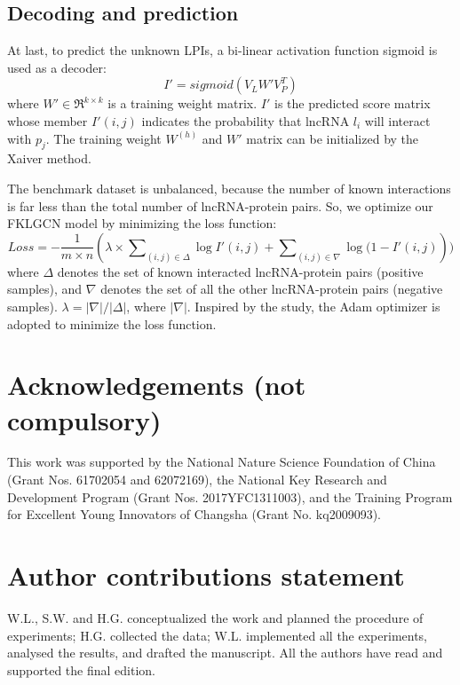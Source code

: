 \documentclass[fleqn,10pt]{wlscirep}
\begin{document}
\subsection*{Decoding and prediction}
At last, to predict the unknown LPIs, a bi-linear activation function sigmoid is used as a decoder:
\begin{equation} \label{eq:decoder}
I' = sigmoid({V_L}W'V_P^T)
\end{equation}
where $W' \in {\Re ^{k \times k}}$ is a training weight matrix. $I'$ is the predicted score matrix whose member $I'(i,j)$ indicates the probability that lncRNA $l_i$ will interact with $p_j$. The training weight ${W^{(h)}}$ and $W'$ matrix can be initialized by the Xaiver method\cite{Glorot2010}.

The benchmark dataset is unbalanced, because the number of known interactions is far less than the total number of lncRNA-protein pairs. So, we optimize our FKLGCN model by minimizing the loss function:
\begin{equation} \label{eq:LOSSr}
Loss =  - \frac{1}{{m \times n}}(\lambda  \times \sum\nolimits_{(i,j) \in \Delta } {\log I'(i,j)}  + \sum\nolimits_{(i,j) \in \nabla } {\log (1 - I'(i,j)} ))
\end{equation}
where $\Delta $ denotes the set of known interacted lncRNA-protein pairs (positive samples), and $\nabla $ denotes the set of all the other lncRNA-protein pairs (negative samples). $\lambda  = \left| \nabla  \right|/\left| \Delta  \right|$, where $\left| \nabla  \right|$. Inspired by the study\cite{Yu2020c}, the Adam optimizer is adopted to minimize the loss function\cite{Kingma2015Adam:Optimization}.


\section*{Acknowledgements (not compulsory)}
This work was supported by the National Nature Science Foundation of China (Grant Nos. 61702054 and 62072169), the National Key Research and Development Program (Grant Nos. 2017YFC1311003), and the Training Program for Excellent Young Innovators of Changsha (Grant No. kq2009093).
\section*{Author contributions statement}
W.L., S.W. and H.G. conceptualized the work and planned the procedure of experiments; H.G. collected the data; W.L. implemented all the experiments, analysed the results, and drafted the manuscript. All the authors have read and supported the final edition. 
\end{document}
